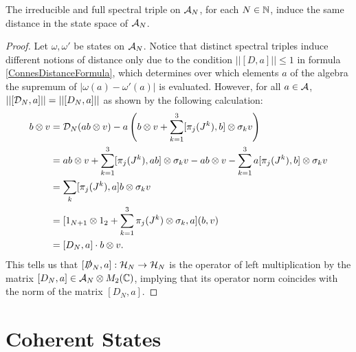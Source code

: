 \begin{theorem}\label{theoremIrreducibleAndFUllSpectralTripleSameDistance}
The irreducible and full spectral triple on $\mathcal A_N$, for each $N \in \mathbb{N}$, induce the same distance in the state space of $\mathcal A_N$.
\end{theorem}
\begin{proof}
Let $\omega, \omega'$ be states on $\mathcal A_N$. Notice that distinct spectral triples induce different notions of distance only due to the condition $||[D, a]|| \leq 1$ in formula \eqref{ConnesDistanceFormula}, which determines over which elements $a$ of the algebra the supremum of $|\omega(a) - \omega'(a)|$ is evaluated. However, for all $a \in \mathcal A$, $||[\mathcal D_N, a]|| = ||[D_N, a]||$ as shown by the following calculation:
\begin{align*}
    [\dcal, a]b \otimes v &= \dcal_N(ab \otimes v) - a\left(b \otimes v + \sum_{k = 1}^3 [\pi_j(J^k), b] \otimes \sigma_k v\right)\\
        &= ab \otimes v + \sum_{k = 1}^3[\pi_j(J^k), ab] \otimes \sigma_k v - ab \otimes v - \sum_{k = 1}^3 a[\pi_j(J^k), b]\otimes \sigma_k v\\
        &= \sum_k [\pi_j(J^k), a]b \otimes \sigma_k v\\
        &= [1_{N+1} \otimes 1_2 + \sum_{k = 1}^3 \pi_j(J^k)\otimes \sigma_k, a](b, v)\\
        &= [D_N, a] \cdot b \otimes v.
\end{align*}
This tells us that $[\slashed D_N, a]: \mathcal H_N \to \mathcal H_N$ is the operator of left multiplication by the matrix $[D_N, a] \in \mathcal A_N \otimes M_2(\mathbb{C})$, implying that its operator norm coincides with the norm of the matrix $[D_N, a]$.
\end{proof}

\section{Coherent States}
\label{ChFSSectCoherentStates}
 {\color{gray}

}

